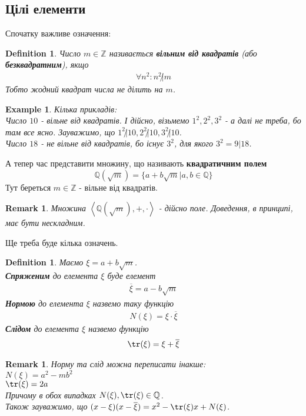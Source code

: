 \documentclass[a4paper, 14pt]{extarticle}
\theoremstyle{theoremdd}
\theoremstyle{theoremdd}
\newtheorem{definition}[theorem]{Definition}
\theoremstyle{theoremdd}
\theoremstyle{theoremdd}
\newtheorem{example}[theorem]{Example}
\theoremstyle{theoremdd}
\theoremstyle{theoremdd}
\newtheorem{remark}[theorem]{Remark}
\theoremstyle{theoremdd}
\theoremstyle{theoremdd}
\begin{document}
\subsection{Цілі елементи}
Спочатку важливе означення:
\begin{definition}
Число $m \in \mathbb{Z}$ називається \textbf{вільним від квадратів} (або \textbf{безквадратним}), якщо
\begin{align*}
\forall n^2: n^2 \not| m
\end{align*}
Тобто жодний квадрат числа не ділить на $m$.
\end{definition}

\begin{example}
Кілька прикладів:\\
Число $10$ - вільне від квадратів. І дійсно, візьмемо $1^2,2^2,3^2$ - а далі не треба, бо там все ясно. Зауважимо, що $1^2 \not| 10, 2^2 \not| 10, 3^2 \not| 10$.
\bigskip \\
Число $18$ - не вільне від квадратів, бо існує $3^2$, для якого $3^2 = 9 | 18$.
\end{example}

А тепер час представити множину, що називають \textbf{квадратичним полем}
$$ \mathbb{Q}(\sqrt{m}) = \{a + b \sqrt{m} | a,b \in \mathbb{Q}\} $$
Тут береться $m \in \mathbb{Z}$ - вільне від квадратів.

\begin{remark}
Множина $\left< \mathbb{Q}(\sqrt{m}), +, \cdot \right>$ - дійсно поле. Доведення, в принципі, має бути нескладним.
\end{remark}

Ще треба буде кілька означень.
\begin{definition}
Маємо $\xi = a + b\sqrt{m}$.\\
\textbf{Спряженим} до елемента $\xi$ буде елемент
\begin{align*}
\overline{\xi} = a - b \sqrt{m}
\end{align*}
\textbf{Нормою} до елемента $\xi$ назвемо таку функцію
\begin{align*}
N(\xi) = \xi \cdot \overline{\xi}
\end{align*}
\textbf{Слідом} до елемента $\xi$ назвемо функцію
\begin{align*}
\tr (\xi) = \xi + \overline{\xi}
\end{align*}
\end{definition}

\begin{remark}
Норму та слід можна переписати інакше:\\
$N(\xi) = a^2 - mb^2$\\
$\tr(\xi) = 2a$\\
Причому в обох випадках $N(\xi), \tr(\xi) \in \mathbb{Q}$.
\bigskip \\
Також зауважимо, що $(x-\xi)(x-\overline{\xi}) = x^2- \tr(\xi)x + N(\xi)$.
\end{remark}
\end{document}
